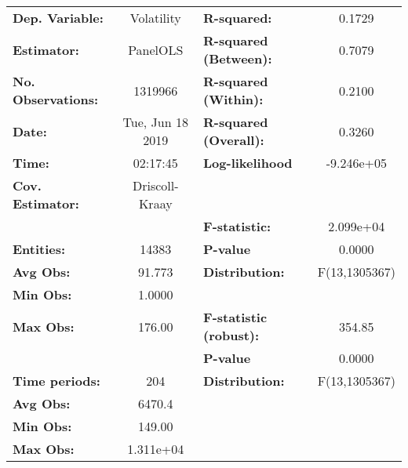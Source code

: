 \begin{center}
\begin{tabular}{lclc}
\toprule
\textbf{Dep. Variable:}                 &     Volatility     & \textbf{  R-squared:         }   &      0.1729      \\
\textbf{Estimator:}                     &      PanelOLS      & \textbf{  R-squared (Between):}  &      0.7079      \\
\textbf{No. Observations:}              &      1319966       & \textbf{  R-squared (Within):}   &      0.2100      \\
\textbf{Date:}                          &  Tue, Jun 18 2019  & \textbf{  R-squared (Overall):}  &      0.3260      \\
\textbf{Time:}                          &      02:17:45      & \textbf{  Log-likelihood     }   &    -9.246e+05    \\
\textbf{Cov. Estimator:}                &   Driscoll-Kraay   & \textbf{                     }   &                  \\
\textbf{}                               &                    & \textbf{  F-statistic:       }   &    2.099e+04     \\
\textbf{Entities:}                      &       14383        & \textbf{  P-value            }   &      0.0000      \\
\textbf{Avg Obs:}                       &       91.773       & \textbf{  Distribution:      }   &  F(13,1305367)   \\
\textbf{Min Obs:}                       &       1.0000       & \textbf{                     }   &                  \\
\textbf{Max Obs:}                       &       176.00       & \textbf{  F-statistic (robust):} &      354.85      \\
\textbf{}                               &                    & \textbf{  P-value            }   &      0.0000      \\
\textbf{Time periods:}                  &        204         & \textbf{  Distribution:      }   &  F(13,1305367)   \\
\textbf{Avg Obs:}                       &       6470.4       & \textbf{                     }   &                  \\
\textbf{Min Obs:}                       &       149.00       & \textbf{                     }   &                  \\
\textbf{Max Obs:}                       &     1.311e+04      & \textbf{                     }   &                  \\

\end{tabular}
\end{center}
